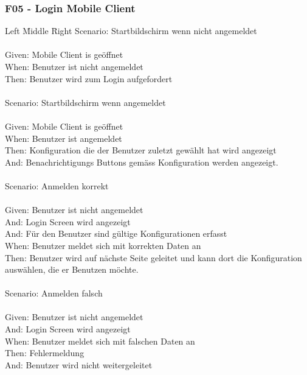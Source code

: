 \subsubsection*{F05 - Login Mobile Client}
\begin{tabbing}
    Left \= Middle \= Right \kill
    Scenario: \> \>  Startbildschirm wenn nicht angemeldet\\ \\
    Given: \> \>   Mobile Client is geöffnet\\
    When: \> \>  Benutzer ist nicht angemeldet\\
    Then: \> \>  Benutzer wird zum Login aufgefordert\\
    \\
    Scenario: \> \>  Startbildschirm wenn angemeldet\\ \\
    Given: \> \>   Mobile Client is geöffnet\\
    When: \> \>  Benutzer ist angemeldet\\
    Then: \> \>  Konfiguration die der Benutzer zuletzt gewählt hat wird angezeigt\\
    And: \> \>    Benachrichtigungs Buttons gemäss Konfiguration werden angezeigt.\\
    \\
    Scenario: \> \>  Anmelden korrekt\\ \\
    Given: \> \>  Benutzer ist nicht angemeldet\\
    And: \> \>    Login Screen wird angezeigt\\
    And: \> \>     Für den Benutzer sind gültige Konfigurationen erfasst\\
    When: \> \>   Benutzer meldet sich mit korrekten Daten an\\
    Then: \> \>   Benutzer wird auf nächste Seite geleitet und kann dort die Konfiguration auswählen, die er Benutzen möchte.\\
    \\
    Scenario: \> \>  Anmelden falsch\\ \\
    Given: \> \>  Benutzer ist nicht angemeldet\\
    And: \> \>    Login Screen wird angezeigt\\
    When: \> \>   Benutzer meldet sich mit falschen Daten an\\
    Then: \> \>   Fehlermeldung\\
    And: \> \>  Benutzer wird nicht weitergeleitet\\

\end{tabbing}
